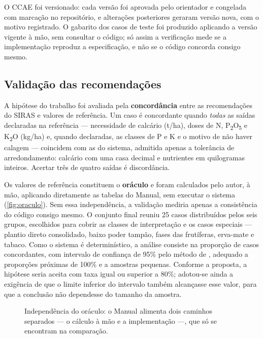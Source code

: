 O CCAE foi versionado: cada versão foi aprovada pelo orientador e congelada com marcação no
repositório, e alterações posteriores geraram versão nova, com o motivo registrado. O gabarito
dos casos de teste foi produzido aplicando a versão vigente à mão, sem consultar o código; só
assim a verificação mede se a implementação reproduz a especificação, e não se o código
concorda consigo mesmo.

\subsection{Validação das recomendações}\label{sec:validacao}

A hipótese do trabalho foi avaliada pela \textbf{concordância} entre as recomendações do SIRAS e
valores de referência. Um caso é concordante quando \emph{todas} as saídas declaradas na
referência --- necessidade de calcário (t/ha), doses de N, P\textsubscript{2}O\textsubscript{5}
e K\textsubscript{2}O (kg/ha) e, quando declaradas, as classes de P e K e o motivo de não haver
calagem --- coincidem com as do sistema, admitida apenas a tolerância de
arredondamento: calcário com uma casa decimal e nutrientes em quilogramas inteiros. Acertar três
de quatro saídas é discordância.

Os valores de referência constituem o \textbf{oráculo} e foram calculados pelo autor, à mão,
aplicando diretamente as tabelas do Manual, sem executar o sistema
(\autoref{fig:oraculo}). Sem essa independência, a validação mediria apenas a consistência do
código consigo mesmo. O conjunto final reuniu 25 casos distribuídos pelos seis grupos,
escolhidos para cobrir as classes de interpretação e os casos especiais --- plantio direto
consolidado, baixo poder tampão, fases das frutíferas, erva-mate e tabaco. Como o
sistema é determinístico, a análise consiste na proporção de casos concordantes, com intervalo
de confiança de 95\% pelo método de \cite{Wilson1927}, adequado a proporções próximas de 100\% e
a amostras pequenas. Conforme a proposta, a hipótese seria aceita com taxa igual ou superior a
80\%; adotou-se ainda a exigência de que o limite inferior do intervalo também alcançasse esse
valor, para que a conclusão não dependesse do tamanho da amostra.

\begin{figure}[!htbp]
\centering
{}
\caption{Independência do oráculo: o Manual alimenta dois caminhos separados --- o cálculo à mão
e a implementação ---, que só se encontram na comparação.}
\label{fig:oraculo}
\end{figure}


